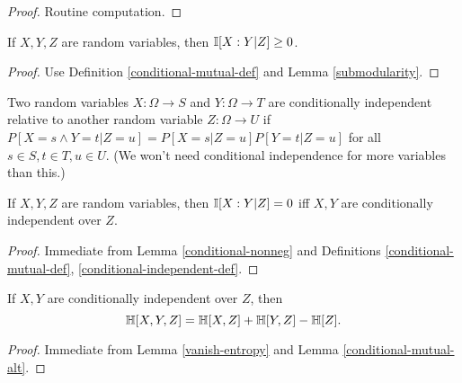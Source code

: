 \begin{proof}\leanok Routine computation.
\end{proof}

\begin{lemma}
\label{conditional-nonneg}
\leanok
If $X,Y,Z$ are random variables, then $\mathbb{I}[X:Y|Z] \ge 0$.
\end{lemma}
\begin{proof}
\leanok
Use Definition \ref{conditional-mutual-def} and Lemma \ref{submodularity}.
\end{proof}

\begin{definition}
\label{conditional-independent-def}
 \leanok
  Two random variables $X: \Omega \to S$ and $Y: \Omega \to T$ are conditionally independent relative to another random variable $Z: \Omega \to U$ if $P[ X = s \wedge Y = t| Z=u] = P[X=s|Z=u] P[Y=t|Z=u]$ for all $s \in S, t \in T, u \in U$.  (We won't need conditional independence for more variables than this.)
\end{definition}

\begin{lemma}\label{conditional-vanish}
  \leanok
  If $X,Y,Z$ are random variables, then $\mathbb{I}[X:Y|Z] = 0$ iff $X,Y$ are conditionally independent over $Z$.
\end{lemma}

\begin{proof}  Immediate from Lemma \ref{conditional-nonneg} and Definitions \ref{conditional-mutual-def}, \ref{conditional-independent-def}.
\end{proof}

\begin{corollary}\label{cond-trial-ent}
  \leanok
  If $X, Y$ are conditionally independent over $Z$, then
  $$ \mathbb{H}[X,Y,Z] =\mathbb{H}[X,Z] + \mathbb{H}[Y,Z] - \mathbb{H}[Z].$$
\end{corollary}

\begin{proof}  Immediate from Lemma \ref{vanish-entropy} and Lemma \ref{conditional-mutual-alt}.
\end{proof}
